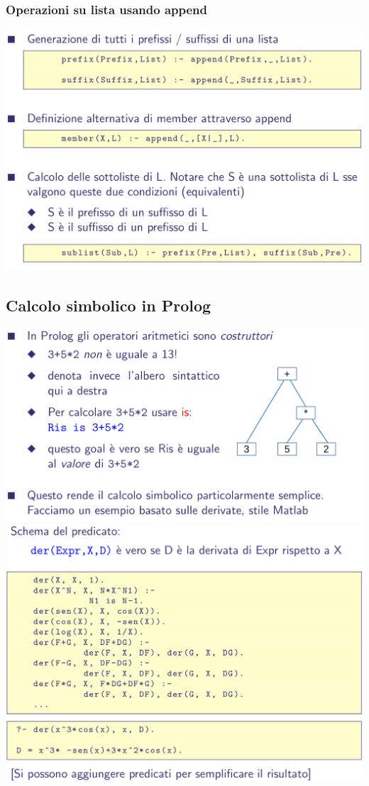 \documentclass[10pt]{article}
\begin{document}
\subsubsection{Operazioni su lista usando append}
\includegraphics[scale=0.25]{Immagini/pl37.png}
\subsection{Calcolo simbolico in Prolog}
\includegraphics[scale=0.25]{Immagini/pl38.png}
\\
\includegraphics[scale=0.25]{Immagini/pl39.png}
\end{document}

